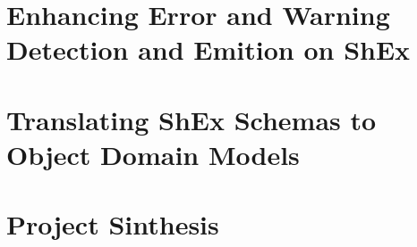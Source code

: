 \documentclass[open=any]{SPhdThesis}
\begin{document}
	\begin{frontmatter}
		\SgAddTitle%
		\SgAddToc%
		\SgAddLof%
		\SgAddLot%
	\end{frontmatter}
   
	
	
	

	\part{Enhancing Error and Warning Detection and Emition on ShEx}
	
	

	\part{Translating ShEx Schemas to Object Domain Models}
	
	

	\part{Project Sinthesis}
	
	
	
\end{document}
